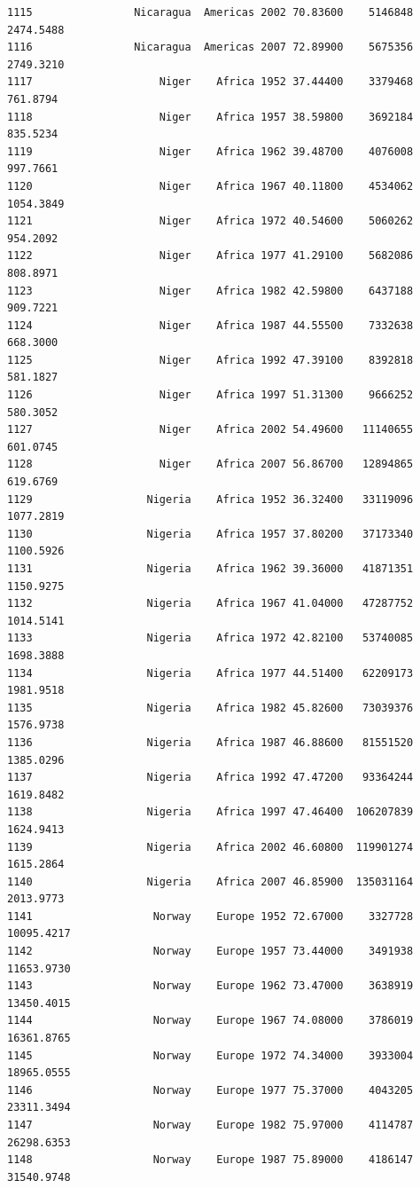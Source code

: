 \documentclass[
  letterpaper,
  DIV=11,
  numbers=noendperiod]{scrreprt}
\begin{document}
\begin{verbatim}
1115                Nicaragua  Americas 2002 70.83600    5146848   2474.5488
1116                Nicaragua  Americas 2007 72.89900    5675356   2749.3210
1117                    Niger    Africa 1952 37.44400    3379468    761.8794
1118                    Niger    Africa 1957 38.59800    3692184    835.5234
1119                    Niger    Africa 1962 39.48700    4076008    997.7661
1120                    Niger    Africa 1967 40.11800    4534062   1054.3849
1121                    Niger    Africa 1972 40.54600    5060262    954.2092
1122                    Niger    Africa 1977 41.29100    5682086    808.8971
1123                    Niger    Africa 1982 42.59800    6437188    909.7221
1124                    Niger    Africa 1987 44.55500    7332638    668.3000
1125                    Niger    Africa 1992 47.39100    8392818    581.1827
1126                    Niger    Africa 1997 51.31300    9666252    580.3052
1127                    Niger    Africa 2002 54.49600   11140655    601.0745
1128                    Niger    Africa 2007 56.86700   12894865    619.6769
1129                  Nigeria    Africa 1952 36.32400   33119096   1077.2819
1130                  Nigeria    Africa 1957 37.80200   37173340   1100.5926
1131                  Nigeria    Africa 1962 39.36000   41871351   1150.9275
1132                  Nigeria    Africa 1967 41.04000   47287752   1014.5141
1133                  Nigeria    Africa 1972 42.82100   53740085   1698.3888
1134                  Nigeria    Africa 1977 44.51400   62209173   1981.9518
1135                  Nigeria    Africa 1982 45.82600   73039376   1576.9738
1136                  Nigeria    Africa 1987 46.88600   81551520   1385.0296
1137                  Nigeria    Africa 1992 47.47200   93364244   1619.8482
1138                  Nigeria    Africa 1997 47.46400  106207839   1624.9413
1139                  Nigeria    Africa 2002 46.60800  119901274   1615.2864
1140                  Nigeria    Africa 2007 46.85900  135031164   2013.9773
1141                   Norway    Europe 1952 72.67000    3327728  10095.4217
1142                   Norway    Europe 1957 73.44000    3491938  11653.9730
1143                   Norway    Europe 1962 73.47000    3638919  13450.4015
1144                   Norway    Europe 1967 74.08000    3786019  16361.8765
1145                   Norway    Europe 1972 74.34000    3933004  18965.0555
1146                   Norway    Europe 1977 75.37000    4043205  23311.3494
1147                   Norway    Europe 1982 75.97000    4114787  26298.6353
1148                   Norway    Europe 1987 75.89000    4186147  31540.9748

\end{verbatim}
\end{document}
